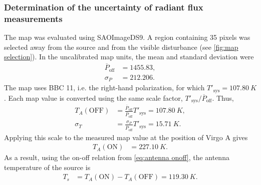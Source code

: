 \documentclass[10pt,a4paper, bibliography=totoc]{scrartcl}
\begin{document}
\subsubsection{Determination of the uncertainty of radiant flux measurements}
The map was evaluated using SAOImageDS9. A region containing 35 pixels was selected away from the source and from the visible disturbance (see \autoref{fig:map selection}). In the uncalibrated map units, the mean and standard deviation were
\begin{align}
    \overline{P}_{\mathrm{off}} &= 1455.83, \\
    \sigma_P &= 212.206.
\end{align}
The map uses BBC 11, i.e. the right-hand polarization, for which $T'_{\mathrm{sys}}=\qty{107.80}{K}$. Each map value is converted using the same scale factor, $T'_{\mathrm{sys}}/\overline{P}_{\mathrm{off}}$. Thus,
\begin{align}
    T_A(\mathrm{OFF}) &= \frac{\overline{P}_{\mathrm{off}}}{\overline{P}_{\mathrm{off}}}T'_{\mathrm{sys}}
    = \qty{107.80}{K}, \\
    \sigma_T &= \frac{\sigma_P}{\overline{P}_{\mathrm{off}}}T'_{\mathrm{sys}}
    = \qty{15.71}{K}.
\end{align}
Applying this scale to the measured map value at the position of Virgo A gives
\begin{align}
    T_A(\mathrm{ON}) &= \qty{227.10}{K}.
\end{align}
As a result, using the on-off relation from \autoref{eq:antenna onoff}, the antenna temperature of the source is
\begin{align}
    T_s &= T_A(\mathrm{ON})-T_A(\mathrm{OFF})
    = \qty{119.30}{K}.
\end{align}
\end{document}
